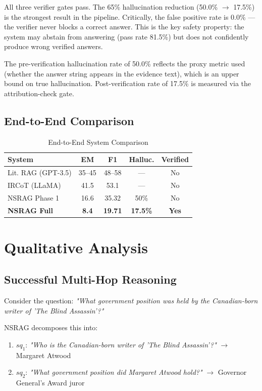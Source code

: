 \documentclass[conference]{IEEEtran}
\begin{document}
All three verifier gates pass. The 65\% hallucination reduction (50.0\% $\rightarrow$ 17.5\%) is the strongest result in the pipeline. Critically, the false positive rate is 0.0\% — the verifier never blocks a correct answer. This is the key safety property: the system may abstain from answering (pass rate 81.5\%) but does not confidently produce wrong verified answers.

The pre-verification hallucination rate of 50.0\% reflects the proxy metric used (whether the answer string appears in the evidence text), which is an upper bound on true hallucination. Post-verification rate of 17.5\% is measured via the attribution-check gate.

\subsection{End-to-End Comparison}

\begin{table}[h]
\centering
\caption{End-to-End System Comparison}
\label{tab:e2e}
\begin{tabular}{lcccc}
\toprule
\textbf{System} & \textbf{EM} & \textbf{F1} & \textbf{Halluc.} & \textbf{Verified} \\
\midrule
Lit. RAG (GPT-3.5) & 35–45 & 48–58 & — & No \\
IRCoT (LLaMA) & 41.5 & 53.1 & — & No \\
NSRAG Phase 1 & 16.6 & 35.32 & 50\% & No \\
\textbf{NSRAG Full} & \textbf{8.4} & \textbf{19.71} & \textbf{17.5\%} & \textbf{Yes} \\
\bottomrule
\end{tabular}
\end{table}

\section{Qualitative Analysis}

\subsection{Successful Multi-Hop Reasoning}
Consider the question: \textit{"What government position was held by the Canadian-born writer of 'The Blind Assassin'?"}

NSRAG decomposes this into:
\begin{enumerate}
    \item $sq_1$: \textit{"Who is the Canadian-born writer of 'The Blind Assassin'?"} $\rightarrow$ Margaret Atwood
    \item $sq_2$: \textit{"What government position did Margaret Atwood hold?"} $\rightarrow$ Governor General's Award juror
\end{enumerate}
\end{document}
